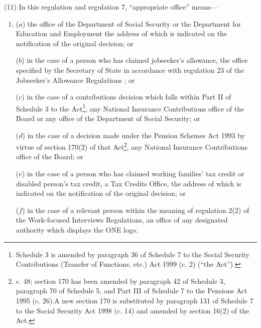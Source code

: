 \documentclass[12pt,a4paper]{article}
\begin{document}
(11) In this regulation and regulation 7, “appropriate office” means---
\begin{enumerate}\item[]
($a$) the office of the Department of Social Security or the Department for Education and Employment the address of which is indicated on the notification of the original decision; or

($b$) in the case of a person who has claimed jobseeker’s allowance, the office specified by the Secretary of State in accordance with regulation 23 of the Jobseeker’s Allowance Regulations%
; or

    ($c$) 
    in the case of a contributions decision which falls within Part II of Schedule 3 to the Act\footnote{\frenchspacing Schedule 3 is amended by paragraph 36 of Schedule 7 to the Social Security Contributions (Transfer of Functions, etc.) Act 1999 (c. 2) (“the Act”).}, any National Insurance Contributions office of the Board or any office of the Department of Social Security; or

    ($d$) 
    in the case of a decision made under the Pension Schemes Act 1993 by virtue of section 170(2) of that Act\footnote{ c. 48; section 170 has been amended by paragraph 42 of Schedule 3, paragraph 70 of Schedule 5, and Part III of Schedule 7 to the Pensions Act 1995 (c. 26).\@ A new section 170 is substituted by paragraph 131 of Schedule 7 to the Social Security Act 1998 (c. 14) and amended by section 16(2) of the Act.}, any National Insurance Contributions office of the Board;
or

($e$) in the case of a person who has claimed working families' tax credit or disabled person’s tax credit, a Tax Credits Office, the address of which is indicated on the notification of the original decision;
or

($f$) in the case of a relevant person within the meaning of regulation 2(2) of the Work-focused Interviews Regulations, an office of any designated authority which displays the ONE logo.
\end{enumerate}
\end{document}
